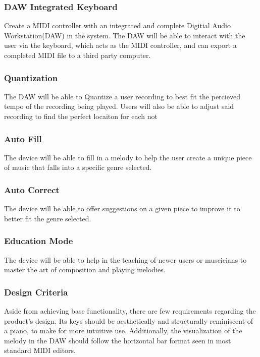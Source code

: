 \subsubsection{DAW Integrated Keyboard}

Create a MIDI controller with an integrated and complete Digitial Audio
Workstation(DAW) in the system. The DAW will be able to interact with the user
via the keyboard, which acts as the MIDI controller, and can export a completed
MIDI file to a third party computer.

\subsubsection{Quantization}

The DAW will be able to Quantize a user recording to best fit the percieved
tempo of the recording being played. Users will also be able to adjust said
recording to find the perfect locaiton for each not

\subsubsection{Auto Fill}

The device will be able to fill in a melody to help the user create a unique
piece of music that falls into a specific genre selected.

\subsubsection{Auto Correct}

The device will be able to offer suggestions on a given piece to improve it to
better fit the genre selected.

\subsubsection{Education Mode}

The device will be able to help in the teaching of newer users or muscicians to
master the art of composition and playing melodies.

\subsubsection{Design Criteria}

Aside from achieving base functionality, there are few requirements regarding the
product’s design. Its keys should be aesthetically and structurally reminiscent of a
piano, to make for more intuitive use. Additionally, the visualization of the melody in
the DAW should follow the horizontal bar format seen in most standard MIDI editors.

